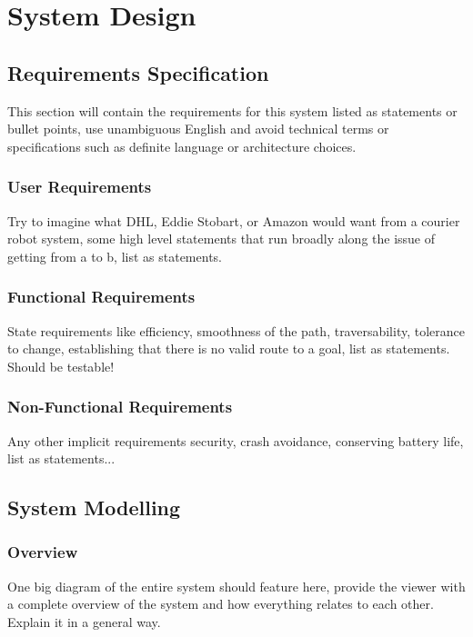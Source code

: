 \chapter{System Design}


\section{Requirements Specification}
This section will contain the requirements for this system listed as statements or bullet points, use unambiguous English and avoid technical terms or specifications such as definite language or architecture choices.

\subsection{User Requirements}
Try to imagine what DHL, Eddie Stobart, or Amazon would want from a courier robot system, some high level statements that run broadly along the issue of getting from a to b, list as statements.

\subsection{Functional Requirements}
State requirements like efficiency, smoothness of the path, traversability, tolerance to change, establishing that there is no valid route to a goal, list as statements. Should be testable!

\subsection{Non-Functional Requirements}
Any other implicit requirements security, crash avoidance, conserving battery life, list as statements...

\newpage


\section{System Modelling}

\subsection{Overview}
One big diagram of the entire system should feature here, provide the viewer with a complete overview of the system and how everything relates to each other. Explain it in a general way.

